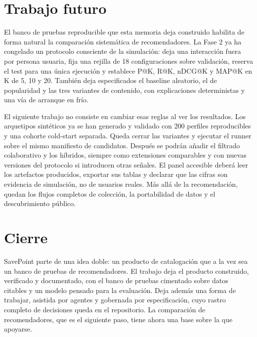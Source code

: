 \section{Trabajo futuro}\label{sec:conc-trabajo-futuro}

El banco de pruebas reproducible que esta memoria deja construido habilita de forma natural
la comparación sistemática de recomendadores. La Fase 2 ya ha congelado un protocolo
consciente de la simulación: deja una interacción fuera por persona usuaria, fija una rejilla
de 18 configuraciones sobre validación, reserva el test para una única ejecución y establece
P@K, R@K, nDCG@K y MAP@K en K de 5, 10 y 20. También deja especificados el baseline
aleatorio, el de popularidad y las tres variantes de contenido, con explicaciones
deterministas y una vía de arranque en frío.

El siguiente trabajo no consiste en cambiar esas reglas al ver los resultados. Los
arquetipos sintéticos ya se han generado y validado con 200 perfiles reproducibles y una
cohorte cold-start separada. Queda cerrar las variantes y ejecutar el runner sobre el mismo
manifiesto de candidatos. Después se podrán añadir el filtrado colaborativo y los
híbridos, siempre como extensiones comparables y con nuevas versiones del protocolo si
introducen otras señales. El panel accesible deberá leer los artefactos producidos, exportar
sus tablas y declarar que las cifras son evidencia de simulación, no de usuarios reales.
Más allá de la recomendación, quedan los flujos completos de colección, la portabilidad de
datos y el descubrimiento público.

\section{Cierre}\label{sec:conc-cierre}

SavePoint parte de una idea doble: un producto de catalogación que a la vez sea un banco de
pruebas de recomendadores. El trabajo deja el producto construido, verificado y documentado,
con el banco de pruebas cimentado sobre datos citables y un modelo pensado para la
evaluación. Deja además una forma de trabajar, asistida por agentes y gobernada por
especificación, cuyo rastro completo de decisiones queda en el repositorio. La comparación de
recomendadores, que es el siguiente paso, tiene ahora una base sobre la que apoyarse.
